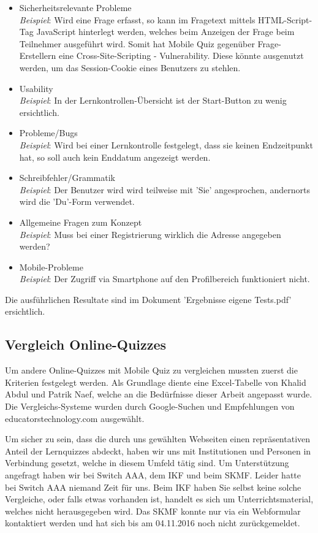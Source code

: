	
	\begin{itemize}
		\item Sicherheitsrelevante Probleme \\
		\textit{Beispiel}: Wird eine Frage erfasst, so kann im Fragetext mittels HTML-Script-Tag JavaScript hinterlegt werden, welches beim Anzeigen der Frage beim Teilnehmer ausgeführt wird. Somit hat Mobile Quiz gegenüber Frage-Erstellern eine \gls{Cross-Site-Scripting} - \gls{Vulnerability}. Diese könnte ausgenutzt werden, um das Session-Cookie eines Benutzers zu stehlen.
		\item Usability \\
		\textit{Beispiel}: In der Lernkontrollen-Übersicht ist der Start-Button zu wenig ersichtlich.
		\item Probleme/Bugs \\
		\textit{Beispiel}: Wird bei einer Lernkontrolle festgelegt, dass sie keinen Endzeitpunkt hat, so soll auch kein Enddatum angezeigt werden.
		\item Schreibfehler/Grammatik \\
		\textit{Beispiel}: Der Benutzer wird wird teilweise mit 'Sie' angesprochen, andernorts wird die 'Du'-Form verwendet.
		\item Allgemeine Fragen zum Konzept \\
		\textit{Beispiel}: Muss bei einer Registrierung wirklich die Adresse angegeben werden?
		\item Mobile-Probleme \\
		\textit{Beispiel}: Der Zugriff via Smartphone auf den Profilbereich funktioniert nicht.
	\end{itemize}

	Die ausführlichen Resultate sind im Dokument 'Ergebnisse eigene Tests.pdf' ersichtlich.
	

	\subsection{Vergleich Online-Quizzes}
	Um andere Online-Quizzes mit Mobile Quiz zu vergleichen mussten zuerst die Kriterien festgelegt werden. Als Grundlage diente eine Excel-Tabelle von Khalid Abdul und Patrik Naef, welche an die Bedürfnisse dieser Arbeit angepasst wurde.
	Die Vergleichs-Systeme wurden durch Google-Suchen und Empfehlungen von educatorstechnology.com \cite{educatorstechnology.com} ausgewählt.
		
	Um sicher zu sein, dass die durch uns gewählten Webseiten einen repräsentativen Anteil der Lernquizzes abdeckt, haben wir uns mit Institutionen und Personen in Verbindung gesetzt, welche in diesem Umfeld tätig sind. Um Unterstützung angefragt haben wir bei Switch AAA, dem \acrfull{IKF} und beim \acrfull{SKMF}.
	Leider hatte bei Switch AAA niemand Zeit für uns. Beim \acrshort{IKF} haben Sie selbst keine solche Vergleiche, oder falls etwas vorhanden ist, handelt es sich um Unterrichtsmaterial, welches nicht herausgegeben wird. Das \acrshort{SKMF} konnte nur via ein Webformular kontaktiert werden und hat sich bis am 04.11.2016 noch nicht zurückgemeldet.
	
